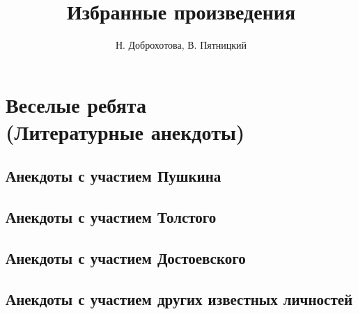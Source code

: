 \documentclass[14pt, a4paper, notitlepage, oneside]{extbook}
\begin{document}
\author{Н. Доброхотова, В. Пятницкий}
\title{Избранные произведения}
\date{}

\maketitle

\part*{Веселые ребята \\ (Литературные анекдоты)}

\chapter*{Анекдоты с участием Пушкина}


\chapter*{Анекдоты с участием Толстого}


\chapter*{Анекдоты с участием Достоевского}


\chapter*{Анекдоты с участием других известных личностей}

\end{document}

